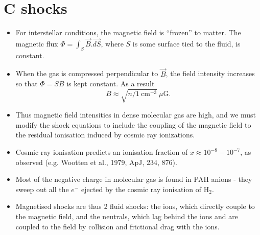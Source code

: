 \section{C shocks}



\begin{frame}{}

\begin{itemize}

\item For interstellar conditions, the magnetic field is ``frozen'' to
  matter.  The magnetic flux $\Phi = \int_S \vec{B}.\vec{dS}$, where
  $S$ is some surface tied to the fluid, is constant.

\item When the gas is compressed perpendicular to $\vec{B}$, the field
  intensity increases so that $ \Phi = S B$ is kept constant. As a
  result \begin{equation} B \approx
    \sqrt{n/1~\mathrm{cm}^{-3}}~\mu\mathrm{G} .\label{eq:Bscale} \end{equation}

\item Thus magnetic field intensities in dense molecular gas are high,
  and we must modify the shock equations to include the coupling of
  the magnetic field to the residual ionisation induced by cosmic ray
  ionizations. 

\end{itemize}

\end{frame}




\begin{frame}{}

\begin{itemize}

\item Cosmic ray ionisation predicts an ionisation fraction of $x
  \approx 10^{-8}- 10^{-7}$, as observed (e.g. Wootten et al., 1979,
  ApJ, 234, 876).

\item Most of the negative charge in molecular gas is found in PAH
  anions - they sweep out all the $e^-$ ejected by the cosmic ray
  ionisation of H$_2$. 

\item Magnetised shocks are thus 2 fluid shocks: the ions, which
  directly couple to the magnetic field, and the neutrals, which lag
  behind the ions and are coupled to the field by collision and
  frictional drag with the ions.

\end{itemize}

\end{frame}





